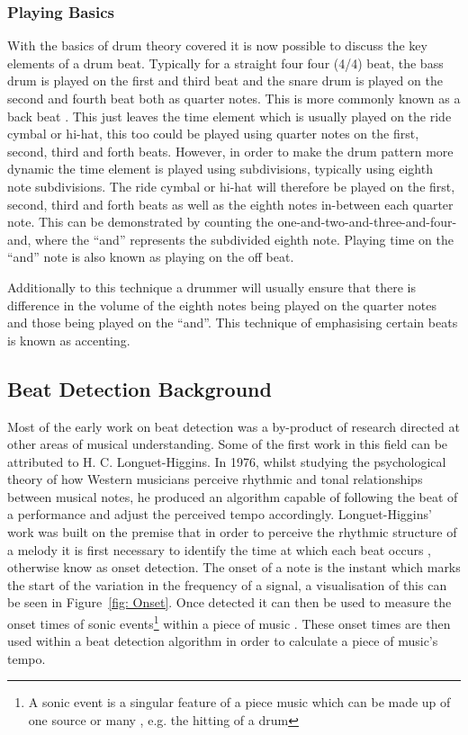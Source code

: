 \documentclass[a4paper, 11pt]{article}
\begin{document}
\subsubsection{Playing Basics}
With the basics of drum theory covered it is now possible to discuss the key elements of a drum beat. Typically for a straight four four (4/4) beat, the bass drum is played on the first and third beat and the snare drum is played on the second and fourth beat both as quarter notes. This is more commonly known as a back beat \cite{drum-bible}. This just leaves the time element which is usually played on the ride cymbal or hi-hat, this too could be played using quarter notes on the first, second, third and forth beats. However, in order to make the drum pattern more dynamic the time element is played using subdivisions, typically using eighth note subdivisions. The ride cymbal or hi-hat will therefore be played on the first, second, third and forth beats as well as the eighth notes in-between each quarter note. This can be demonstrated by counting the one-and-two-and-three-and-four-and, where the ``and'' represents the subdivided eighth note. Playing time on the ``and'' note is also known as playing on the off beat. \par

Additionally to this technique a drummer will usually ensure that there is difference in the volume of the eighth notes being played on the quarter notes and those being played on the ``and''. This technique of emphasising certain beats is known as accenting. 


\subsection{Beat Detection Background}
Most of the early work on beat detection was a by-product of research directed at other areas of musical understanding. Some of the first work in this field can be attributed to H. C. Longuet-Higgins. In 1976, whilst studying the psychological theory of how Western musicians perceive rhythmic and tonal relationships between musical notes, he produced an algorithm capable of following the beat of a performance and adjust the perceived tempo accordingly\cite{allen-danneburg}. Longuet-Higgins' work was built on the premise that in order to perceive the rhythmic structure of a melody it is first necessary to identify the time at which each beat occurs \cite{longeut1}, otherwise know as onset detection. The onset of a note is the instant which marks the start of the variation in the frequency of a signal, a visualisation of this can be seen in Figure~\ref{fig: Onset}. Once detected it can then be used to measure the onset times of sonic events\footnote{A sonic event is a singular feature of a piece music which can be made up of one source or many \cite{sonic}, e.g. the hitting of a drum} within a piece of music \cite{mirex-onset}. These onset times are then used within a beat detection algorithm in order to calculate a piece of music's tempo. 
\end{document}
